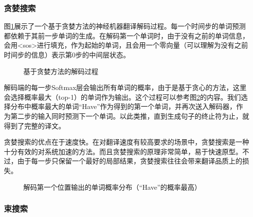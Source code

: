 
\subsubsection{贪婪搜索}

\parinterval 图\ref{fig:6-32}展示了一个基于贪婪方法的神经机器翻译解码过程。每一个时间步的单词预测都依赖于其前一步单词的生成。在解码第一个单词时，由于没有之前的单词信息，会用<sos>进行填充，作为起始的单词，且会用一个零向量（可以理解为没有之前时间步的信息）表示第0步的中间层状态。

\begin{figure}[htp]
\centering

\caption{基于贪婪方法的解码过程}
\label{fig:6-32}
\end{figure}

\parinterval 解码端的每一步Softmax层会输出所有单词的概率，由于是基于贪心的方法，这里会选择概率最大（top-1）的单词作为输出。这个过程可以参考图\ref{fig:6-33}的内容。我们选择分布中概率最大的单词``Have''作为得到的第一个单词，并再次送入解码器，作为第二步的输入同时预测下一个单词。以此类推，直到生成句子的终止符为止，就得到了完整的译文。

\parinterval 贪婪搜索的优点在于速度快。在对翻译速度有较高要求的场景中，贪婪搜索是一种十分有效的对系统加速的方法。而且贪婪搜索的原理非常简单，易于快速原型。不过，由于每一步只保留一个最好的局部结果，贪婪搜索往往会带来翻译品质上的损失。

\begin{figure}[htp]
\centering

\caption{解码第一个位置输出的单词概率分布（``Have''的概率最高）}
\label{fig:6-33}
\end{figure}


\subsubsection{束搜索}

